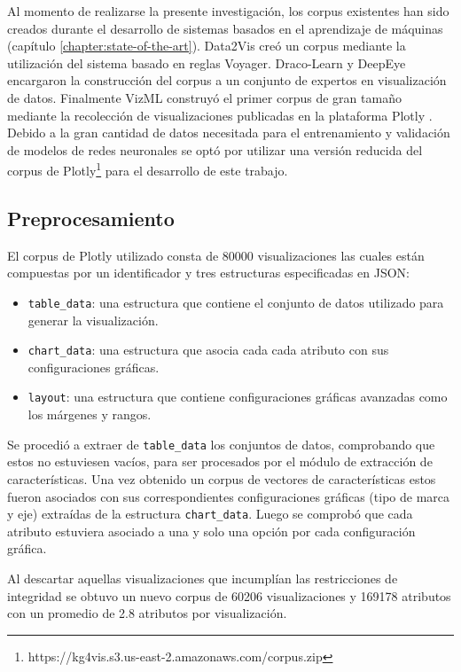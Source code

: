 Al momento de realizarse la presente investigaci\'on, los corpus existentes
han sido creados durante el desarrollo de sistemas basados en el aprendizaje de m\'aquinas (cap\'itulo \ref{chapter:state-of-the-art}).
Data2Vis cre\'o un corpus mediante la utilizaci\'on del sistema basado en reglas Voyager. Draco-Learn y DeepEye encargaron
la construcci\'on del corpus a un conjunto de expertos en visualizaci\'on de datos. Finalmente VizML construy\'o el primer corpus
de gran tama\~no mediante la recolecci\'on de visualizaciones publicadas en la plataforma Plotly \cite{plotly}. Debido a la gran cantidad
de datos necesitada para el entrenamiento y validaci\'on de modelos de redes neuronales se opt\'o por utilizar una versi\'on reducida
del corpus de Plotly\footnote[1]{https://kg4vis.s3.us-east-2.amazonaws.com/corpus.zip} para el desarrollo de
este trabajo.

\subsection{Preprocesamiento}\label{subsection: prepros}


El corpus de Plotly utilizado consta de 80000 visualizaciones las cuales
est\'an compuestas por un identificador y tres estructuras especificadas en JSON:
\begin{itemize}
    \item  \texttt{table\_data}: una estructura que contiene el conjunto de datos utilizado para generar la visualizaci\'on.
     \item \texttt{chart\_data}: una estructura que asocia cada cada atributo con sus configuraciones gr\'aficas.
     \item \texttt{layout}: una estructura que contiene configuraciones gr\'aficas avanzadas como los m\'argenes y rangos.
\end{itemize}

Se procedi\'o a extraer de \texttt{table\_data} los conjuntos de datos, comprobando que estos no estuviesen vac\'ios, para ser
 procesados por
el m\'odulo de extracci\'on de caracter\'isticas. Una vez obtenido un corpus de vectores de caracter\'isticas estos fueron asociados con sus correspondientes
configuraciones gr\'aficas (tipo de marca y eje) extra\'idas de la estructura \texttt{chart\_data}. Luego se comprob\'o
que cada atributo estuviera asociado a una y solo una opci\'on por cada configuraci\'on gr\'afica.

Al descartar aquellas visualizaciones
que incumpl\'ian las restricciones de integridad se obtuvo un nuevo corpus de 60206 visualizaciones y 169178 atributos con un promedio de
2.8 atributos por visualizaci\'on.

